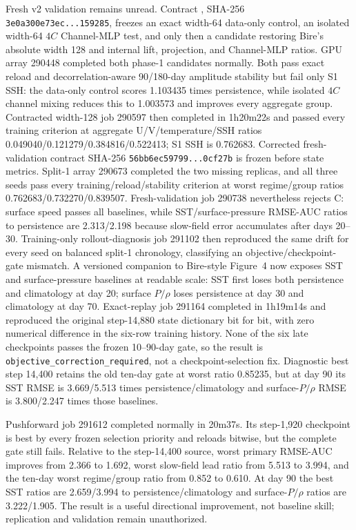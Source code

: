 \documentclass[11pt]{article}
\begin{document}
Fresh v2 validation remains unread.  Contract
, SHA-256
\texttt{3e0a300e73ec...159285}, freezes an exact width-64 data-only control, an isolated
width-64 \(4C\) Channel-MLP test, and only then a candidate restoring Bire's absolute
width 128 and internal lift, projection, and Channel-MLP ratios.
GPU array 290448 completed both phase-1 candidates normally.  Both pass exact reload
and decorrelation-aware 90/180-day amplitude stability but fail only S1 SSH:
the data-only control scores 1.103435 times persistence, while isolated \(4C\)
channel mixing reduces this to 1.003573 and improves every aggregate group.
Contracted width-128 job 290597 then completed in 1h20m22s and passed every training
criterion at aggregate U/V/temperature/SSH ratios
0.049040/0.121279/0.384816/0.522413; S1 SSH is 0.762683.  Corrected fresh-validation
contract SHA-256 \texttt{56bb6ec59799...0cf27b} is frozen before state metrics.
Split-1 array 290673 completed the two missing replicas, and all three seeds pass every
training/reload/stability criterion at worst regime/group ratios
0.762683/0.732270/0.839507.  Fresh-validation job 290738 nevertheless rejects C:
surface speed passes all baselines, while SST/surface-pressure RMSE-AUC ratios to
persistence are 2.313/2.198 because slow-field error accumulates after days 20--30.
Training-only rollout-diagnosis job 291102 then reproduced the same drift for every
seed on balanced split-1 chronology, classifying an objective/checkpoint-gate mismatch.
A versioned companion to Bire-style Figure~4 now exposes SST and surface-pressure
baselines at readable scale: SST first loses both persistence and climatology at day
20; surface \(P/\rho\) loses persistence at day 30 and climatology at day 70.
Exact-replay job 291164 completed in 1h19m14s and reproduced the original
step-14,880 state dictionary bit for bit, with zero numerical difference in the
six-row training history.  None of the six late checkpoints passes the frozen
10--90-day gate, so the result is
\texttt{objective\_correction\_required}, not a checkpoint-selection fix.  Diagnostic
best step 14,400 retains the old ten-day gate at worst ratio 0.85235, but at day 90
its SST RMSE is 3.669/5.513 times persistence/climatology and surface-\(P/\rho\)
RMSE is 3.800/2.247 times those baselines.

Pushforward job 291612 completed normally in 20m37s.  Its step-1,920 checkpoint is
best by every frozen selection priority and reloads bitwise, but the complete gate
still fails.  Relative to the step-14,400 source, worst primary RMSE-AUC improves
from 2.366 to 1.692, worst slow-field lead ratio from 5.513 to 3.994, and the
ten-day worst regime/group ratio from 0.852 to 0.610.  At day 90 the best SST ratios
are 2.659/3.994 to persistence/climatology and surface-\(P/\rho\) ratios are
3.222/1.905.  The result is a useful directional improvement, not baseline skill;
replication and validation remain unauthorized.
\end{document}
